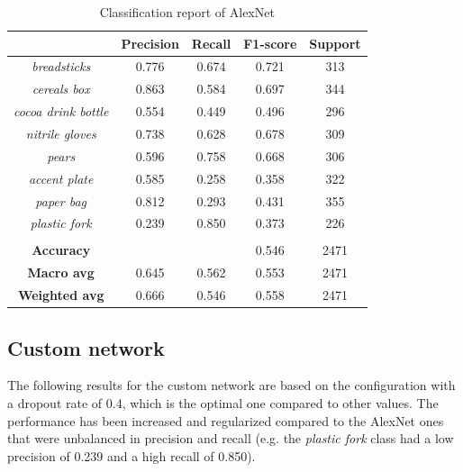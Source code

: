 \documentclass[11pt]{article}
\begin{document}
   \begin{table}[H]
		\centering	
		\begin{tabular}{c|c|c|c|c}
			\hline
			& \textbf{Precision} & \textbf{Recall} & \textbf{F1-score} & \textbf{Support} \\
			\hline
			\textit{breadsticks} & 0.776 & 0.674 & 0.721 & 313 \\
			\textit{cereals box} & 0.863 & 0.584 & 0.697 & 344 \\
			\textit{cocoa drink bottle} & 0.554 & 0.449 & 0.496 & 296 \\
			\textit{nitrile gloves} & 0.738 & 0.628 & 0.678 & 309 \\
			\textit{pears} & 0.596 & 0.758 & 0.668 & 306 \\
			\textit{accent plate} & 0.585 & 0.258 & 0.358 & 322 \\
			\textit{paper bag} & 0.812 & 0.293 & 0.431 & 355 \\
			\textit{plastic fork} & 0.239 & 0.850 & 0.373 & 226 \\
			\hline
			\multicolumn{5}{c}{} \\
			\hline
			\textbf{Accuracy} & & & 0.546 & 2471 \\
			\textbf{Macro avg} & 0.645 & 0.562 & 0.553 & 2471 \\
			\textbf{Weighted avg} & 0.666 & 0.546 & 0.558 & 2471 \\
			\hline
		\end{tabular}
		\caption{Classification report of AlexNet}
	\end{table}


	\subsection{Custom network}
	The following results for the custom network are based on the configuration
	with a dropout rate of 0.4, which is the optimal one compared to other values.
	The performance has been increased and regularized compared to the AlexNet ones
	that were unbalanced in precision and recall (e.g. the \textit{plastic fork} class
	had a low precision of 0.239 and a high recall of 0.850).
\end{document}
